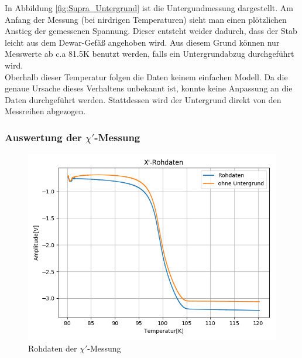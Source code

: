 \documentclass[12pt,a4paper]{article}
\begin{document}
In Abbildung \ref{fig:Supra_Untergrund} ist die Untergundmessung dargestellt. Am Anfang der Messung (bei nirdrigen Temperaturen) sieht man einen plötzlichen Anstieg der gemessenen Spannung. Dieser entsteht weider dadurch, dass der Stab leicht aus dem Dewar-Gefäß angehoben wird. Aus diesem Grund können nur Messwerte ab c.a 81.5K benutzt werden, falls ein Untergrundabzug durchgeführt wird.\\
Oberhalb dieser Temperatur folgen die Daten keinem einfachen Modell. Da die genaue Ursache dieses Verhaltens unbekannt ist, konnte keine Anpassung an die Daten durchgeführt werden. Stattdessen wird der Untergrund direkt von den Messreihen abgezogen.

\subsubsection{Auswertung der $\chi'$-Messung}
\begin{figure}
\centering
\includegraphics[scale=0.8]{Bilder/Haupt_Supra/X1roh.png}
\caption{Rohdaten der $\chi'$-Messung}
\label{fig:Supra_X1roh}
\end{figure}
\end{document}
